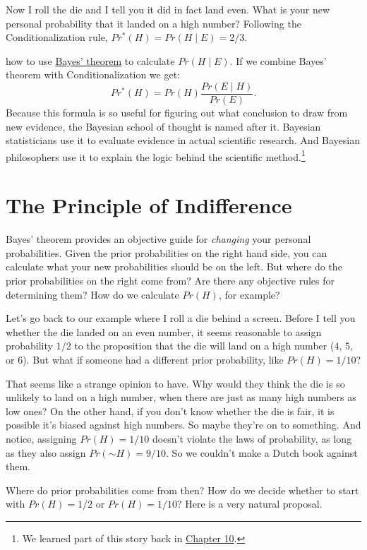 \documentclass[justified]{tufte-book}
\newcommand{\given}{\mid}
\renewcommand{\neg}{\mathbin{\sim}}
\newcommand{\pr}{Pr}
\newcommand{\po}{Pr^*}
\theoremstyle{definition}
\theoremstyle{definition}
\theoremstyle{definition}
\theoremstyle{definition}
\theoremstyle{remark}
\begin{document}
Now I roll the die and I tell you it did in fact land even. What is your new personal probability that it landed on a high number? Following the Conditionalization rule, \(\po(H) = \pr(H \given E) = 2/3\).

 how to use \protect\hyperlink{bayes-theorem}{Bayes' theorem} to calculate \(\pr(H \given E)\). If we combine Bayes' theorem with Conditionalization we get:
\[ \po(H) = \pr(H) \frac{\pr(E \given H)}{\pr(E)}. \]
Because this formula is so useful for figuring out what conclusion to draw from new evidence, the Bayesian school of thought is named after it. Bayesian statisticians use it to evaluate evidence in actual scientific research. And Bayesian philosophers use it to explain the logic behind the scientific method.\footnote{We learned part of this story back in \protect\hyperlink{probability-induction}{Chapter 10}.}

\hypertarget{the-principle-of-indifference}{%
\section{The Principle of Indifference}\label{the-principle-of-indifference}}

Bayes' theorem provides an objective guide for \emph{changing} your personal probabilities. Given the prior probabilities on the right hand side, you can calculate what your new probabilities should be on the left. But where do the prior probabilities on the right come from? Are there any objective rules for determining them? How do we calculate \(\pr(H)\), for example?

Let's go back to our example where I roll a die behind a screen. Before I tell you whether the die landed on an even number, it seems reasonable to assign probability \(1/2\) to the proposition that the die will land on a high number (\(4\), \(5\), or \(6\)). But what if someone had a different prior probability, like \(\pr(H) = 1/10\)?

That seems like a strange opinion to have. Why would they think the die is so unlikely to land on a high number, when there are just as many high numbers as low ones? On the other hand, if you don't know whether the die is fair, it is possible it's biased against high numbers. So maybe they're on to something. And notice, assigning \(\pr(H) = 1/10\) doesn't violate the laws of probability, as long as they also assign \(\pr(\neg H) = 9/10\). So we couldn't make a Dutch book against them.

Where do prior probabilities come from then? How do we decide whether to start with \(\pr(H) = 1/2\) or \(\pr(H) = 1/10\)? Here is a very natural proposal.
\end{document}
